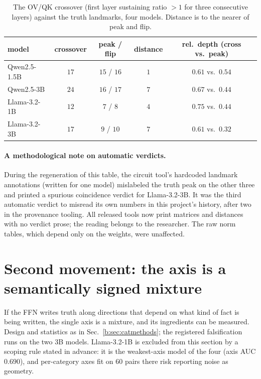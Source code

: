 \documentclass[11pt]{article}
\begin{document}
\begin{table}[H]
\centering
\caption{The OV/QK crossover (first layer sustaining ratio $>1$ for three
consecutive layers) against the truth landmarks, four models. Distance is
to the nearer of peak and flip.}
\label{b:tab:crossover}
\begin{tabular}{lcccc}
\toprule
model & crossover & peak / flip & distance & rel.\ depth (cross vs.\ peak) \\
\midrule
Qwen2.5-1.5B & $17$ & $15$ / $16$ & $1$ & $0.61$ vs.\ $0.54$ \\
Qwen2.5-3B   & $24$ & $16$ / $17$ & $7$ & $0.67$ vs.\ $0.44$ \\
Llama-3.2-1B & $12$ & $7$ / $8$   & $4$ & $0.75$ vs.\ $0.44$ \\
Llama-3.2-3B & $17$ & $9$ / $10$  & $7$ & $0.61$ vs.\ $0.32$ \\
\bottomrule
\end{tabular}
\end{table}

\paragraph{A methodological note on automatic verdicts.} During the
regeneration of this table, the circuit tool's hardcoded landmark
annotations (written for one model) mislabeled the truth peak on the other
three and printed a spurious coincidence verdict for Llama-3.2-3B. It was
the third automatic verdict to misread its own numbers in this project's
history, after two in the provenance tooling. All released tools now print
matrices and distances with no verdict prose; the reading belongs to the
researcher. The raw norm tables, which depend only on the weights, were
unaffected.

\section{Second movement: the axis is a semantically signed mixture}
\label{b:sec:mixture}

If the FFN writes truth along directions that depend on what kind of fact
is being written, the single axis is a mixture, and its ingredients can be
measured. Design and statistics as in Sec.~\ref{b:sec:catmethods}; the
registered falsification runs on the two 3B models. Llama-3.2-1B is
excluded from this section by a scoping rule stated in advance: it is the
weakest-axis model of the four (axis AUC $0.690$), and per-category axes
fit on $60$ pairs there risk reporting noise as geometry.
\end{document}
